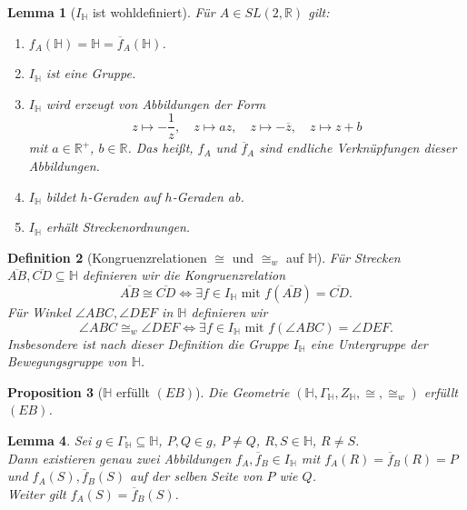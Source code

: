 \documentclass[a4paper,12pt]{article}
\theoremstyle{break}
\newtheorem{definition}{Definition}[section]
\newtheorem{proposition}[definition]{Proposition}
\newtheorem{lemma}[definition]{Lemma}
\begin{document}
\begin{lemma}[$I_{\mathbb{H}}$ ist wohldefiniert]
Für \( A \in SL(2, \mathbb{R}) \) gilt:
\begin{enumerate}
    \item \( f_A(\mathbb{H}) = \mathbb{H} = \overline{f}_A(\mathbb{H}) \).
    \item \( I_{\mathbb{H}} \) ist eine Gruppe.
    \item \( I_{\mathbb{H}} \) wird erzeugt von Abbildungen der Form
    \[
    z \mapsto -\frac{1}{z}, \quad z \mapsto az, \quad z \mapsto -\overline{z}, \quad z \mapsto z + b
    \]
    mit \( a \in \mathbb{R}^+ \), \( b \in \mathbb{R} \).  
    Das heißt, \( f_A \) und \( \overline{f}_A \) sind endliche Verknüpfungen dieser Abbildungen.
    \item \( I_{\mathbb{H}} \) bildet \(h\)-Geraden auf \(h\)-Geraden ab.
    \item \( I_{\mathbb{H}} \) erhält Streckenordnungen.
\end{enumerate}
\end{lemma}

\begin{definition}[Kongruenzrelationen \(\cong\) und \(\cong_w\) auf \(\mathbb{H}\)]
Für Strecken \(\overline{AB}, \overline{CD} \subseteq \mathbb{H}\) definieren wir die Kongruenzrelation  
\[
\overline{AB} \cong \overline{CD} \iff \exists f \in I_{\mathbb{H}} \text{ mit } f(\overline{AB}) = \overline{CD}.
\]
Für Winkel \(\angle ABC, \angle DEF\) in \(\mathbb{H}\) definieren wir  
\[
\angle ABC \cong_w \angle DEF \iff \exists f \in I_{\mathbb{H}} \text{ mit } f(\angle ABC) = \angle DEF.
\]
Insbesondere ist nach dieser Definition die Gruppe \( I_{\mathbb{H}} \) eine Untergruppe der Bewegungsgruppe von \(\mathbb{H}\).
\end{definition}

\begin{proposition}[$\mathbb{H}$ erfüllt \((EB)\)]
    Die Geometrie $(\mathbb{H}, \Gamma_\mathbb{H}, Z_\mathbb{H}, \cong, \cong_w)$ erfüllt \((EB)\).
\end{proposition}

\begin{lemma}
    Sei $g\in\Gamma_\mathbb{H}\subseteq\mathbb{H}$, $P,Q\in g$, $P\neq Q$, $R,S\in\mathbb{H}$, $R\neq S$.\\Dann existieren genau zwei Abbildungen $f_A,\overline{f}_B\in I_\mathbb{H}$ mit $f_A(R)=\overline{f}_B(R)=P$ und $f_A(S),\overline{f}_B(S)$ auf der selben Seite von $P$ wie $Q$. \\Weiter gilt $f_A(S)=\overline{f}_B(S)$.
\end{lemma}
\end{document}

